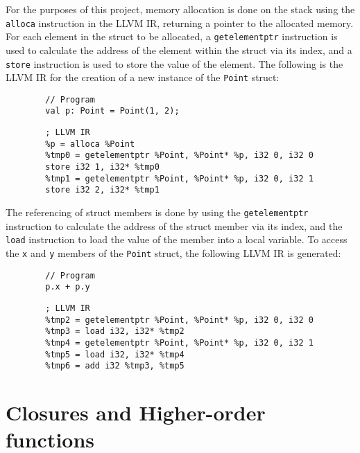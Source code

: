 For the purposes of this project, memory allocation is done on the stack using the \texttt{alloca}
instruction in the LLVM IR, returning a pointer to the allocated memory. For each element in the
struct to be allocated, a \texttt{getelementptr} instruction is used to calculate the address of the
element within the struct via its index, and a \texttt{store} instruction is used to store the value
of the element. The following is the LLVM IR for the creation of a new instance of the
\texttt{Point} struct:

\begin{tcolorbox}
    \begin{verbatim}
        // Program
        val p: Point = Point(1, 2);
    \end{verbatim}
    \tcblower
    \begin{verbatim}
        ; LLVM IR
        %p = alloca %Point
        %tmp0 = getelementptr %Point, %Point* %p, i32 0, i32 0
        store i32 1, i32* %tmp0
        %tmp1 = getelementptr %Point, %Point* %p, i32 0, i32 1
        store i32 2, i32* %tmp1
    \end{verbatim}
\end{tcolorbox}

The referencing of struct members is done by using the \texttt{getelementptr} instruction to
calculate the address of the struct member via its index, and the \texttt{load} instruction to load
the value of the member into a local variable. To access the \texttt{x} and \texttt{y} members of
the \texttt{Point} struct, the following LLVM IR is generated:

\begin{tcolorbox}
    \begin{verbatim}
        // Program
        p.x + p.y
    \end{verbatim}
    \tcblower
    \begin{verbatim}
        ; LLVM IR
        %tmp2 = getelementptr %Point, %Point* %p, i32 0, i32 0
        %tmp3 = load i32, i32* %tmp2
        %tmp4 = getelementptr %Point, %Point* %p, i32 0, i32 1
        %tmp5 = load i32, i32* %tmp4
        %tmp6 = add i32 %tmp3, %tmp5
    \end{verbatim}
\end{tcolorbox}

\section{Closures and Higher-order functions}

